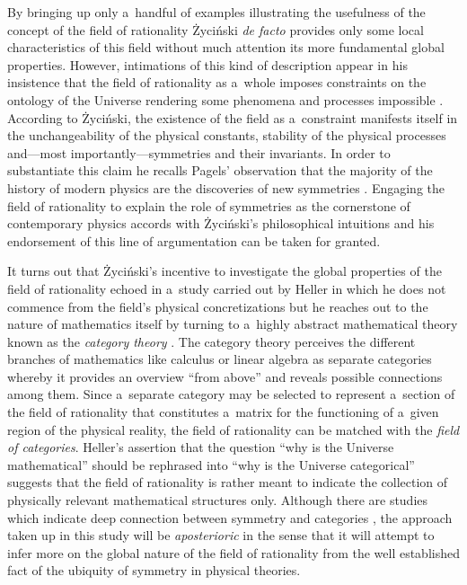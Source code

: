 By bringing up only a~handful of examples illustrating the usefulness of the concept of the field of rationality Życiński \textit{de facto} provides only some local characteristics of this field without much attention its more fundamental global properties. However, intimations of this kind of description appear in his insistence that the field of rationality as a~whole imposes constraints on the ontology of the Universe rendering some phenomena and processes impossible 
\parencite[][p.180]{zycinski_filozoficzne_1987}. %
 According to Życiński, the existence of the field as a~constraint manifests itself in the unchangeability of the physical constants, stability of the physical processes and---most importantly---symmetries and their invariants. In order to substantiate this claim he recalls Pagels' observation that the majority of the history of modern physics are the discoveries of new symmetries 
\parencite[][p.296]{pagels_cosmic_1983}. %
 Engaging the field of rationality to explain the role of symmetries as the cornerstone of contemporary physics accords with Życiński's philosophical intuitions and his endorsement of this line of argumentation can be taken for granted.



It turns out that Życiński's incentive to investigate the global properties of the field of rationality echoed in a~study carried out by Heller in which he does not commence from the field's physical concretizations but he reaches out to the nature of mathematics itself by turning to a~highly abstract mathematical theory known as the \textit{category theory} 
\parencite[][]{heller_field_2014}. %
 The category theory perceives the different branches of mathematics like calculus or linear algebra as separate categories whereby it provides an overview ``from above'' and reveals possible connections among them. Since a~separate category may be selected to represent a~section of the field of rationality that constitutes a~matrix for the functioning of a~given region of the physical reality, the field of rationality can be matched with the \textit{field of categories}. Heller's assertion that the question ``why is the Universe mathematical'' should be rephrased into ``why is the Universe categorical'' suggests that the field of rationality is rather meant to indicate the collection of physically relevant mathematical structures only. Although there are studies which indicate deep connection between symmetry and categories 
\parencite[e.g][]{heunen_principle_2008}, %
 the approach taken up in this study will be \textit{aposterioric} in the sense that it will attempt to infer more on the global nature of the field of rationality from the well established fact of the ubiquity of symmetry in physical theories.



